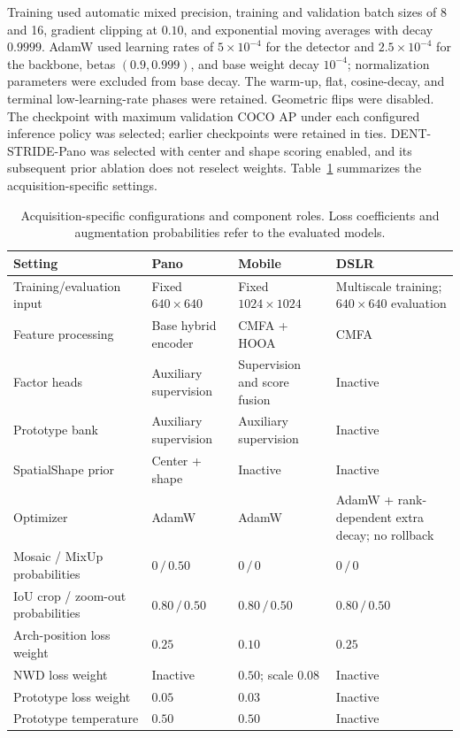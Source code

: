 \documentclass[a4paper,fleqn]{cas-dc}
\begin{document}
Training used automatic mixed precision, training and validation batch sizes of 8 and 16, gradient clipping at $0.10$, and exponential moving averages with decay $0.9999$. AdamW used learning rates of $5\times10^{-4}$ for the detector and $2.5\times10^{-4}$ for the backbone, betas $(0.9,0.999)$, and base weight decay $10^{-4}$; normalization parameters were excluded from base decay. The warm-up, flat, cosine-decay, and terminal low-learning-rate phases were retained. Geometric flips were disabled. The checkpoint with maximum validation COCO AP under each configured inference policy was selected; earlier checkpoints were retained in ties. DENT-STRIDE-Pano was selected with center and shape scoring enabled, and its subsequent prior ablation does not reselect weights. Table~\ref{tab:table2} summarizes the acquisition-specific settings.


\begin{table}[pos=t,width=\textwidth]
\caption{Acquisition-specific configurations and component roles. Loss coefficients and augmentation probabilities refer to the evaluated models.}
\label{tab:table2}
\centering
\footnotesize
\setlength{\tabcolsep}{4pt}
\renewcommand{\arraystretch}{1.15}
\begin{tabularx}{\textwidth}{@{}p{}XXX@{}}
\toprule
Setting & Pano & Mobile & DSLR \\
\midrule
Training/evaluation input & Fixed $640\times640$ & Fixed $1024\times1024$ & Multiscale training; $640\times640$ evaluation \\
Feature processing & Base hybrid encoder & CMFA + HOOA & CMFA \\
Factor heads & Auxiliary supervision & Supervision and score fusion & Inactive \\
Prototype bank & Auxiliary supervision & Auxiliary supervision & Inactive \\
SpatialShape prior & Center + shape & Inactive & Inactive \\
Optimizer & AdamW & AdamW & AdamW + rank-dependent extra decay; no rollback \\
Mosaic / MixUp probabilities & $0\,/\,0.50$ & $0\,/\,0$ & $0\,/\,0$ \\
IoU crop / zoom-out probabilities & $0.80\,/\,0.50$ & $0.80\,/\,0.50$ & $0.80\,/\,0.50$ \\
Arch-position loss weight & $0.25$ & $0.10$ & $0.25$ \\
NWD loss weight & Inactive & $0.50$; scale $0.08$ & Inactive \\
Prototype loss weight & $0.05$ & $0.03$ & Inactive \\
Prototype temperature & $0.50$ & $0.50$ & Inactive \\
\bottomrule
\end{tabularx}
\end{table}
\end{document}
